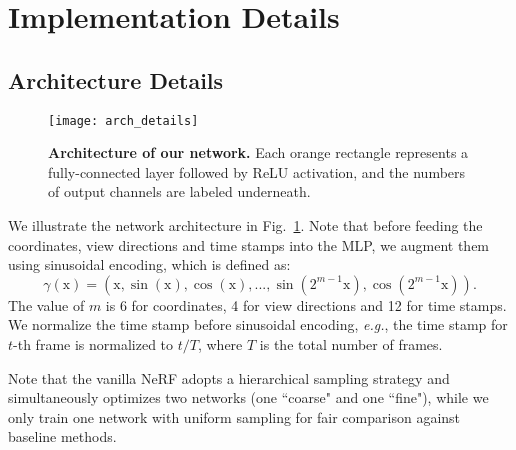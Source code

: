 






\section{Implementation Details}
\label{sec:imp_details}
\subsection{Architecture Details}

\begin{figure}
    \centering
    \texttt{[image: arch\_details]}
    \caption{\textbf{Architecture of our network.} Each orange rectangle represents a fully-connected layer followed by ReLU activation, and the numbers of output channels are labeled underneath. }
    \label{fig:arch_details}
\end{figure}



We illustrate the network architecture in Fig.~\ref{fig:arch_details}. Note that before feeding the coordinates, view directions and time stamps into the MLP, we augment them using sinusoidal encoding, which is defined as: 
\begin{equation}
    \gamma (\bm{\mathrm{x}}) = \left(\bm{\mathrm{x}}, \sin(\bm{\mathrm{x}}), \cos(\bm{\mathrm{x}}), ..., \sin(2^{m-1}\bm{\mathrm{x}}), \cos(2^{m-1}\bm{\mathrm{x}}) \right). \nonumber
\end{equation}
The value of $m$ is 6 for coordinates, 4 for view directions and 12 for time stamps. We normalize the time stamp before sinusoidal encoding, \textit{e.g.}, the time stamp for $t$-th frame is normalized to $t/T$, where $T$ is the total number of frames. 

Note that the vanilla NeRF adopts a hierarchical sampling strategy and  simultaneously optimizes two networks (one ``coarse" and one ``fine"), while we only train one network with uniform sampling for fair comparison against baseline methods. 

